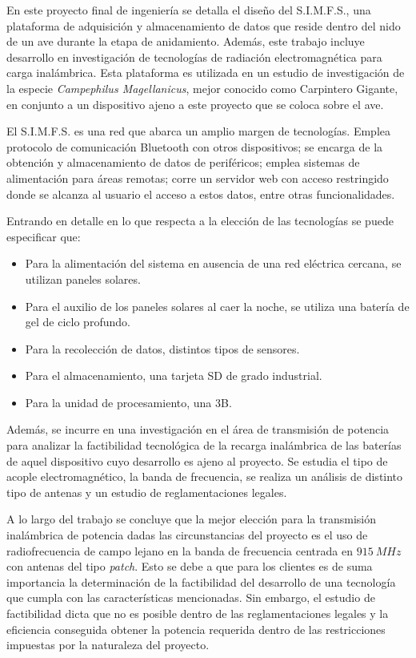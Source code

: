 En este proyecto final de ingeniería se detalla el diseño del S.I.M.F.S., una plataforma de adquisición y almacenamiento de datos que reside dentro del nido de un ave durante la etapa de anidamiento. Además, este trabajo incluye desarrollo en investigación de tecnologías de radiación electromagnética para carga inalámbrica. Esta plataforma es utilizada en un estudio de investigación de la especie \textit{Campephilus Magellanicus}, mejor conocido como Carpintero Gigante, en conjunto a un dispositivo ajeno a este proyecto que se coloca sobre el ave.

El S.I.M.F.S. es una red que abarca un amplio margen de tecnologías. Emplea protocolo de comunicación Bluetooth con otros dispositivos; se encarga de la obtención y almacenamiento de datos de periféricos; emplea sistemas de alimentación para áreas remotas; corre un servidor web con acceso restringido donde se alcanza al usuario el acceso a estos datos, entre otras funcionalidades.


Entrando en detalle en lo que respecta a la elección de las tecnologías se puede especificar que:
\begin{itemize}
	\item Para la alimentación del sistema en ausencia de una red eléctrica cercana, se utilizan paneles solares.
	\item Para el auxilio de los paneles solares al caer la noche, se utiliza una batería de gel de ciclo profundo.
	\item Para la recolección de datos, distintos tipos de sensores.
	\item Para el almacenamiento, una tarjeta SD de grado industrial.
	\item Para la unidad de procesamiento, una \rspi 3B.
\end{itemize}

Además, se incurre en una investigación en el área de transmisión de potencia para analizar la factibilidad tecnológica de la recarga inalámbrica de las baterías de aquel dispositivo cuyo desarrollo es ajeno al proyecto. Se estudia el tipo de acople electromagnético, la banda de frecuencia, se realiza un análisis de distinto tipo de antenas y un estudio de reglamentaciones legales.

A lo largo del trabajo se concluye que la mejor elección para la transmisión inalámbrica de potencia dadas las circunstancias del proyecto es el uso de radiofrecuencia de campo lejano en la banda de frecuencia centrada en $915 \ MHz$ con antenas del tipo \textit{patch}. Esto se debe a que para los clientes es de suma importancia la determinación de la factibilidad del desarrollo de una tecnología que cumpla con las características mencionadas. Sin embargo, el estudio de factibilidad dicta que no es posible dentro de las reglamentaciones legales y la eficiencia conseguida obtener la potencia requerida dentro de las restricciones impuestas por la naturaleza del proyecto.

